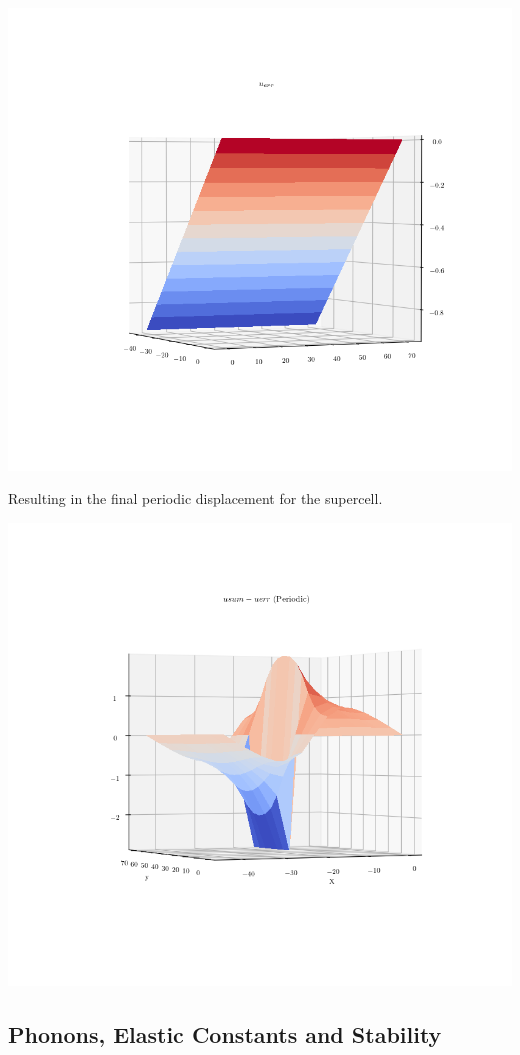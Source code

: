\documentclass[11pt]{article}
\begin{document}
\begin{enumerate}
\begin{center}
\includegraphics[width=.9\linewidth]{Images/u_err_dipole_O_arrangement.png}
\end{center}
Resulting in the final periodic displacement for the supercell. 
\begin{center}
\includegraphics[width=.9\linewidth]{Images/u_dipole_O_arrangement_periodic_displacement.png}
\end{center}
\end{enumerate}

\subsection{Phonons, Elastic Constants and Stability}
\label{sec:orgfc4374c}
\end{document}
